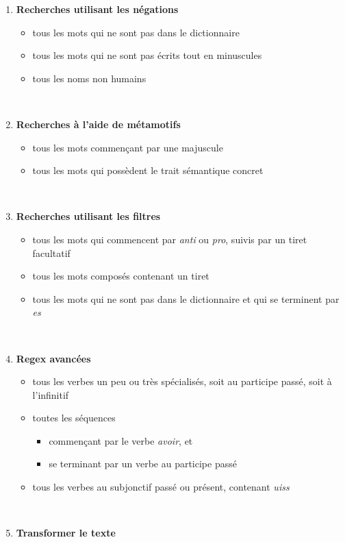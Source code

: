 \documentclass[xcolor={table,usenames,dvipsnames}]{article}
\begin{document}
\begin{enumerate}
\item \textbf{Recherches utilisant les négations}
\begin{itemize}
\item tous les mots qui ne sont pas dans le dictionnaire
\item tous les mots qui ne sont pas écrits tout en minuscules
\item tous les noms non humains
\end{itemize}
	\\
\bigskip

\item \textbf{Recherches à l'aide de métamotifs}
\begin{itemize}
	\item tous les mots commençant par une majuscule
	\item tous les mots qui possèdent le trait sémantique \og{}concret\fg{}
\end{itemize}
\\
\bigskip

\item \textbf{Recherches utilisant les filtres}
\begin{itemize}
	\item tous les mots qui commencent par \textit{anti} ou \textit{pro}, suivis par un tiret facultatif
	\item tous les mots composés contenant un tiret
	\item tous les mots qui ne sont pas dans le dictionnaire et qui se terminent par \textit{es}
\end{itemize}
\\
\bigskip
 
 \item \textbf{Regex avancées}
 \begin{itemize}
 	\item tous les verbes un peu ou très spécialisés, soit au participe passé, soit à l'infinitif
 	\item toutes les séquences
 	\begin{itemize}
 		\item commençant par le verbe \textit{avoir}, et
 		\item se terminant par un verbe au participe passé
 	\end{itemize}
 	\item tous les verbes au subjonctif passé ou présent, contenant \textit{uiss}
 \end{itemize}
\\
\bigskip
\item \textbf{Transformer le texte}


\end{enumerate}
\end{document}
